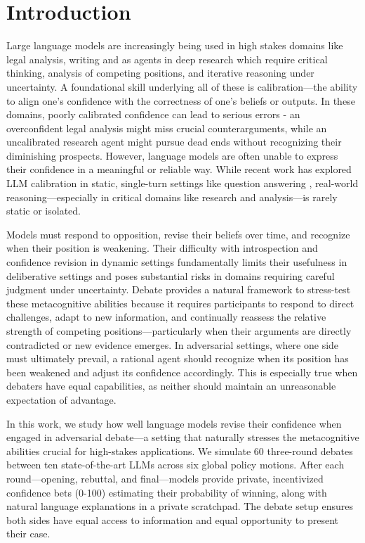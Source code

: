 \documentclass{article}
\begin{document}
\section{Introduction}
Large language models are increasingly being used in high stakes domains like legal analysis, writing and as agents in deep research \cite{handa2025economictasksperformedai} \cite{zheng2025deepresearcherscalingdeepresearch} which require critical thinking, analysis of competing positions, and iterative reasoning under uncertainty. A foundational skill underlying all of these is calibration—the ability to align one's confidence with the correctness of one's beliefs or outputs. In these domains, poorly calibrated confidence can lead to serious errors - an overconfident legal analysis might miss crucial counterarguments, while an uncalibrated research agent might pursue dead ends without recognizing their diminishing prospects. However, language models are often unable to express their confidence in a meaningful or reliable way. While recent work has explored LLM calibration in static, single-turn settings like question answering \citep{tian2023justask, xiong2024uncertainty, kadavath2022know}, real-world reasoning—especially in critical domains like research and analysis—is rarely static or isolated.

Models must respond to opposition, revise their beliefs over time, and recognize when their position is weakening. Their difficulty with introspection and confidence revision in dynamic settings fundamentally limits their usefulness in deliberative settings and poses substantial risks in domains requiring careful judgment under uncertainty. Debate provides a natural framework to stress-test these metacognitive abilities because it requires participants to respond to direct challenges, adapt to new information, and continually reassess the relative strength of competing positions—particularly when their arguments are directly contradicted or new evidence emerges. In adversarial settings, where one side must ultimately prevail, a rational agent should recognize when its position has been weakened and adjust its confidence accordingly. This is especially true when debaters have equal capabilities, as neither should maintain an unreasonable expectation of advantage.

In this work, we study how well language models revise their confidence when engaged in adversarial debate—a setting that naturally stresses the metacognitive abilities crucial for high-stakes applications. We simulate 60 three-round debates between ten state-of-the-art LLMs across six global policy motions. After each round—opening, rebuttal, and final—models provide private, incentivized confidence bets (0-100) estimating their probability of winning, along with natural language explanations in a private scratchpad. The debate setup ensures both sides have equal access to information and equal opportunity to present their case.
\end{document}
